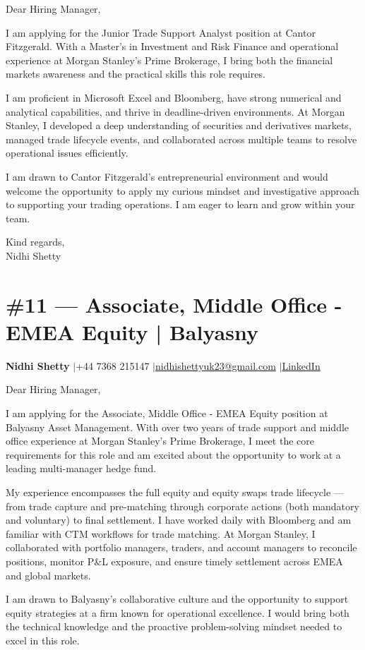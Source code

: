 \documentclass[11pt,a4paper]{article}
\makeatletter
\newcommand{\coverheader}{%
\begin{flushleft}
{\bfseries Nidhi Shetty} \enspace$\vert$\enspace +44 7368 215147 \enspace$\vert$\enspace \href{mailto:nidhishettyuk23@gmail.com}{nidhishettyuk23@gmail.com} \enspace$\vert$\enspace \href{https://www.linkedin.com/in/nidhi-shetty23-1841b7181}{LinkedIn}
\end{flushleft}
\vspace{4pt}
}
\makeatother
\begin{document}
Dear Hiring Manager,

I am applying for the Junior Trade Support Analyst position at Cantor Fitzgerald. With a Master's in Investment and Risk Finance and operational experience at Morgan Stanley's Prime Brokerage, I bring both the financial markets awareness and the practical skills this role requires.

I am proficient in Microsoft Excel and Bloomberg, have strong numerical and analytical capabilities, and thrive in deadline-driven environments. At Morgan Stanley, I developed a deep understanding of securities and derivatives markets, managed trade lifecycle events, and collaborated across multiple teams to resolve operational issues efficiently.

I am drawn to Cantor Fitzgerald's entrepreneurial environment and would welcome the opportunity to apply my curious mindset and investigative approach to supporting your trading operations. I am eager to learn and grow within your team.

\vspace{8pt}
Kind regards,\\
Nidhi Shetty

\newpage
\section{\#11 --- Associate, Middle Office - EMEA Equity | Balyasny}
\coverheader

Dear Hiring Manager,

I am applying for the Associate, Middle Office - EMEA Equity position at Balyasny Asset Management. With over two years of trade support and middle office experience at Morgan Stanley's Prime Brokerage, I meet the core requirements for this role and am excited about the opportunity to work at a leading multi-manager hedge fund.

My experience encompasses the full equity and equity swaps trade lifecycle --- from trade capture and pre-matching through corporate actions (both mandatory and voluntary) to final settlement. I have worked daily with Bloomberg and am familiar with CTM workflows for trade matching. At Morgan Stanley, I collaborated with portfolio managers, traders, and account managers to reconcile positions, monitor P\&L exposure, and ensure timely settlement across EMEA and global markets.

I am drawn to Balyasny's collaborative culture and the opportunity to support equity strategies at a firm known for operational excellence. I would bring both the technical knowledge and the proactive problem-solving mindset needed to excel in this role.
\end{document}
